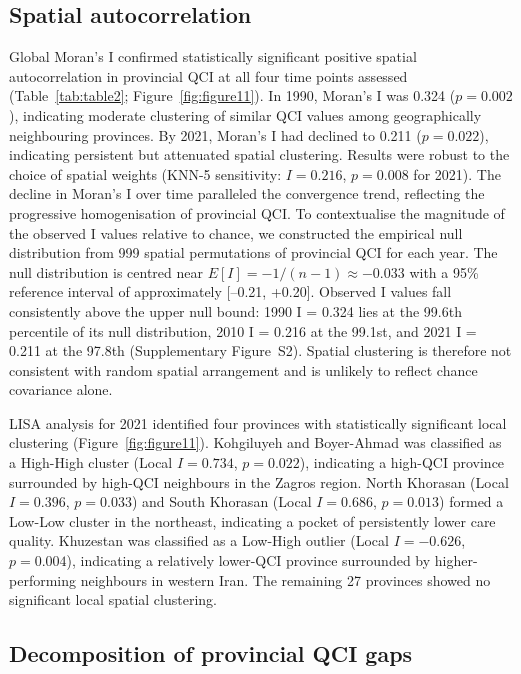 \documentclass[12pt]{article}
\begin{document}
\subsection{Spatial autocorrelation}

Global Moran's I confirmed statistically significant positive spatial autocorrelation in provincial QCI at all four time points assessed (Table~\ref{tab:table2}; Figure~\ref{fig:figure11}). In 1990, Moran's I was 0.324 ($p = 0.002$), indicating moderate clustering of similar QCI values among geographically neighbouring provinces. By 2021, Moran's I had declined to 0.211 ($p = 0.022$), indicating persistent but attenuated spatial clustering. Results were robust to the choice of spatial weights (KNN-5 sensitivity: $I = 0.216$, $p = 0.008$ for 2021). The decline in Moran's I over time paralleled the convergence trend, reflecting the progressive homogenisation of provincial QCI. To contextualise the magnitude of the observed I values relative to chance, we constructed the empirical null distribution from 999 spatial permutations of provincial QCI for each year. The null distribution is centred near $E[I] = -1/(n-1) \approx -0.033$ with a 95\% reference interval of approximately [--0.21, +0.20]. Observed I values fall consistently above the upper null bound: 1990 I = 0.324 lies at the 99.6th percentile of its null distribution, 2010 I = 0.216 at the 99.1st, and 2021 I = 0.211 at the 97.8th (Supplementary Figure~S2). Spatial clustering is therefore not consistent with random spatial arrangement and is unlikely to reflect chance covariance alone.

LISA analysis for 2021 identified four provinces with statistically significant local clustering (Figure~\ref{fig:figure11}). Kohgiluyeh and Boyer-Ahmad was classified as a High-High cluster (Local $I = 0.734$, $p = 0.022$), indicating a high-QCI province surrounded by high-QCI neighbours in the Zagros region. North Khorasan (Local $I = 0.396$, $p = 0.033$) and South Khorasan (Local $I = 0.686$, $p = 0.013$) formed a Low-Low cluster in the northeast, indicating a pocket of persistently lower care quality. Khuzestan was classified as a Low-High outlier (Local $I = -0.626$, $p = 0.004$), indicating a relatively lower-QCI province surrounded by higher-performing neighbours in western Iran. The remaining 27 provinces showed no significant local spatial clustering.

\subsection{Decomposition of provincial QCI gaps}
\end{document}
